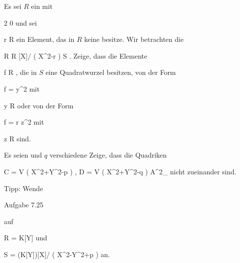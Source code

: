 {}
{





Es sei $R$ ein
mit

\mavergleichskette
{\vergleichskette
{ 2
}
{ \neq }{ 0
}
{  }{
}
{    }{
}
{   }{
}
}
{}{}{}
und sei

\mavergleichskette
{\vergleichskette
{ r
}
{ \in }{ R
}
{  }{
}
{    }{
}
{   }{
}
}
{}{}{}
ein Element, das in $R$ keine
besitze. Wir betrachten die

\mavergleichskettedisp
{\vergleichskette
{ R
}
{ \subset} { R [X]/ \left(  X^2-r  \right)
}
{ } { S
}
{ } {
}
{ } {
}
}
{}{}{.}
Zeige, dass die Elemente

\mavergleichskette
{\vergleichskette
{ f
}
{ \in }{ R
}
{  }{
}
{    }{
}
{   }{
}
}
{}{}{,}
die in $S$ eine Quadratwurzel besitzen, von der Form

\mavergleichskettedisp
{\vergleichskette
{ f
}
{ =} { y^2
}
{ } {
}
{ } {
}
{ } {
}
}
{}{}{}
mit

\mavergleichskette
{\vergleichskette
{ y
}
{ \in }{ R
}
{  }{
}
{    }{
}
{   }{
}
}
{}{}{}
oder von der Form

\mavergleichskettedisp
{\vergleichskette
{ f
}
{ =} { r z^2
}
{ } {
}
{ } {
}
{ } {
}
}
{}{}{}
mit

\mavergleichskette
{\vergleichskette
{ z
}
{ \in }{ R
}
{  }{
}
{    }{
}
{   }{
}
}
{}{}{}
sind.





}
{} {}

{}
{





Es seien
 und $q$ verschiedene
Zeige, dass die
 {} {}
Quadriken

\mavergleichskettedisp
{\vergleichskette
{C = V \left(  X^2+Y^2-p  \right) , D = V \left(  X^2+Y^2-q  \right)
}
{ \subset} { {\mathbb A}^{2}_{ \Q }
}
{ } {
}
{ } {
}
{ } {
}
}
{}{}{}
nicht zueinander
sind.





}
{} {Tipp: Wende

Aufgabe 7.25

auf

\mavergleichskette
{\vergleichskette
{ R
}
{ = }{ K[Y]
}
{  }{
}
{    }{
}
{   }{
}
}
{}{}{}
und

\mavergleichskette
{\vergleichskette
{ S
}
{ = }{ (K[Y])[X]/ \left(  X^2-Y^2+p  \right)
}
{  }{
}
{    }{
}
{   }{
}
}
{}{}{}
an.}





